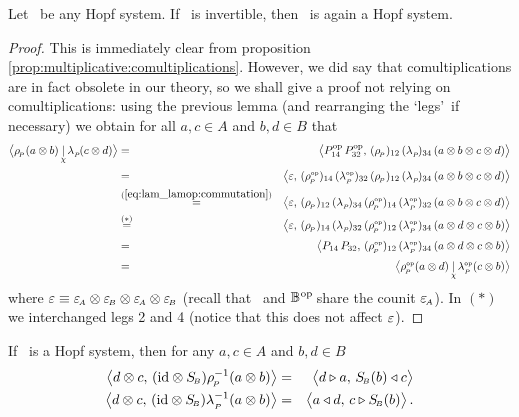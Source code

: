 \begin{lemma_sec} \label{lem:ABop_invertible_implies_Hopf_system}
Let\/ \pairAB\ be any Hopf system.
If\/ \pairABop\ is invertible, then\/ \pairABop\ is again a Hopf system.
\end{lemma_sec}
\begin{proof}
This is immediately clear from proposition \ref{prop:multiplicative:comultiplications}\@.
However, we did say that comultiplications are in fact obsolete in our theory,
so we shall give a proof not relying on comultiplications: using the previous lemma
(and rearranging the \lq legs\rq\ if necessary) we obtain
for all $a,c\in A$ and $b,d\in B$ that
\begin{eqnarray*}
      \pairflipM{\rp(a \tens b)}{\lp(c\tens d)}
  &=&
      \pairM{P\op_{14} \, P\op_{32}}{(\rp)_{12} \, (\lp)_{34} \, (a \tens b \tens c \tens d)}
\\&=\vertL&
      \pairM{\eps}{(\rpop)_{14} \, (\lpop)_{32} \,
                   (\rp)_{12}   \, (\lp)_{34}   \,
                   (a \tens b \tens c \tens d)}
\\&\stackrel{(\ref{eq:lam_lamop:commutation})}{=}&
      \pairM{\eps}{(\rp)_{12}   \, (\lp)_{34}   \,
                   (\rpop)_{14} \, (\lpop)_{32} \,
                   (a \tens b \tens c \tens d)}
\\&\stackrel{(*)}{=}&
      \pairM{\eps}{(\rp)_{14}   \, (\lp)_{32}   \,
                   (\rpop)_{12} \, (\lpop)_{34} \,
                   (a \tens d \tens c \tens b)}
\\&=\vertL&
      \pairM{P_{14} \, P_{32}}{(\rpop)_{12} \, (\lpop)_{34} \,
                   (a \tens d \tens c \tens b)}
\\&=\vertL&
      \pairflipM{\rpop(a \tens d)}{\lpop(c\tens b)}
\end{eqnarray*}
where $\varepsilon \equiv \varepsilon_{\scriptscriptstyle \! A} \otimes \varepsilon_{\scriptscriptstyle \! B} \otimes \varepsilon_{\scriptscriptstyle \! A} \otimes \varepsilon_{\scriptscriptstyle \! B}$
(recall that \BB\ and $\mathbb{B}^{\hspace{0.5pt}\rm op\!}$ share the counit $\varepsilon_{\scriptscriptstyle \! A}$).
In $(*)$ we interchanged legs 2 and 4 (notice that this does not affect $\varepsilon$).
\end{proof}


\begin{lemma_sec}  \label{lem:lamrhoPop:antipode}
If\/ \pairAB\ is a Hopf system, then for any\/ $a,c \in A$ and\/ $b,d \in B$
\begin{eqnarray*}
  \pairM{d \tens c}{(\id \tens \SB)\rp^{-1}(a \tens b)}
         &=&  \pairM{d \lact a}{\SB(b) \ract c}
  \\
  \pairM{d \tens c}{(\id \tens \SB)\lp^{-1}(a \tens b)}
         &=&  \pairM{a \ract d}{c \lact \SB(b)}.
\end{eqnarray*}
\end{lemma_sec}

